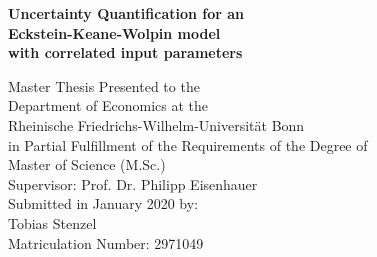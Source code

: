 \begin{titlepage}
	
\begin{center}
	
\vspace*{1.0cm}

{\LARGE
\bfseries Uncertainty Quantification for an \\
\vspace*{0.5cm}
Eckstein-Keane-Wolpin model
}
\\
\vspace*{0.5cm}
{\LARGE
\bfseries with correlated input parameters
}

{\large
\vspace*{4.0cm}
Master Thesis Presented to the\\
\vspace*{0.25cm}
Department of Economics at the\\
\vspace*{0.25cm}
Rheinische Friedrichs-Wilhelm-Universität Bonn\\

\vspace*{2.0cm}
in Partial Fulfillment of the Requirements of the Degree of\\
\vspace*{0.25cm}
Master of Science (M.Sc.)\\

\vspace*{4.0cm}
Supervisor: Prof. Dr. Philipp Eisenhauer\\

\vspace*{2.0cm}
Submitted in January 2020 by:\\
Tobias Stenzel\\
Matriculation Number: 2971049
}

\end{center}

\end{titlepage}